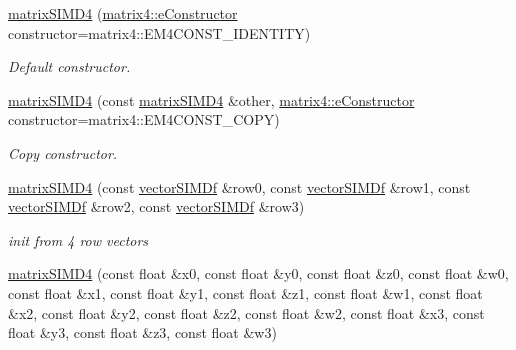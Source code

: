 \begin{DoxyCompactItemize}
\item 
\hyperlink{classirr_1_1core_1_1matrixSIMD4_ad941c3ea98b19b0b0cb9c07b63b8615b}{matrix\+S\+I\+M\+D4} (\hyperlink{classirr_1_1core_1_1CMatrix4_a7bb79712227617f706ed57a34f3eb4fe}{matrix4\+::e\+Constructor} constructor=matrix4\+::\+E\+M4\+C\+O\+N\+S\+T\+\_\+\+I\+D\+E\+N\+T\+I\+TY)
\begin{DoxyCompactList}\small\item\em Default constructor. \end{DoxyCompactList}\item 
\hyperlink{classirr_1_1core_1_1matrixSIMD4_ac2e86af9bb3dff4123441db4c583d7af}{matrix\+S\+I\+M\+D4} (const \hyperlink{classirr_1_1core_1_1matrixSIMD4}{matrix\+S\+I\+M\+D4} \&other, \hyperlink{classirr_1_1core_1_1CMatrix4_a7bb79712227617f706ed57a34f3eb4fe}{matrix4\+::e\+Constructor} constructor=matrix4\+::\+E\+M4\+C\+O\+N\+S\+T\+\_\+\+C\+O\+PY)
\begin{DoxyCompactList}\small\item\em Copy constructor. \end{DoxyCompactList}\item 
\hyperlink{classirr_1_1core_1_1matrixSIMD4_a3cd4ef4a7c2333f8f71c9567c1020405}{matrix\+S\+I\+M\+D4} (const \hyperlink{classirr_1_1core_1_1vectorSIMDf}{vector\+S\+I\+M\+Df} \&row0, const \hyperlink{classirr_1_1core_1_1vectorSIMDf}{vector\+S\+I\+M\+Df} \&row1, const \hyperlink{classirr_1_1core_1_1vectorSIMDf}{vector\+S\+I\+M\+Df} \&row2, const \hyperlink{classirr_1_1core_1_1vectorSIMDf}{vector\+S\+I\+M\+Df} \&row3)\hypertarget{classirr_1_1core_1_1matrixSIMD4_a3cd4ef4a7c2333f8f71c9567c1020405}{}\label{classirr_1_1core_1_1matrixSIMD4_a3cd4ef4a7c2333f8f71c9567c1020405}

\begin{DoxyCompactList}\small\item\em init from 4 row vectors \end{DoxyCompactList}\item 
\hyperlink{classirr_1_1core_1_1matrixSIMD4_a9e52554ea0d5312f9ed917ec2e63f3dd}{matrix\+S\+I\+M\+D4} (const float \&x0, const float \&y0, const float \&z0, const float \&w0, const float \&x1, const float \&y1, const float \&z1, const float \&w1, const float \&x2, const float \&y2, const float \&z2, const float \&w2, const float \&x3, const float \&y3, const float \&z3, const float \&w3)\hypertarget{classirr_1_1core_1_1matrixSIMD4_a9e52554ea0d5312f9ed917ec2e63f3dd}{}\label{classirr_1_1core_1_1matrixSIMD4_a9e52554ea0d5312f9ed917ec2e63f3dd}


\end{DoxyCompactItemize}
